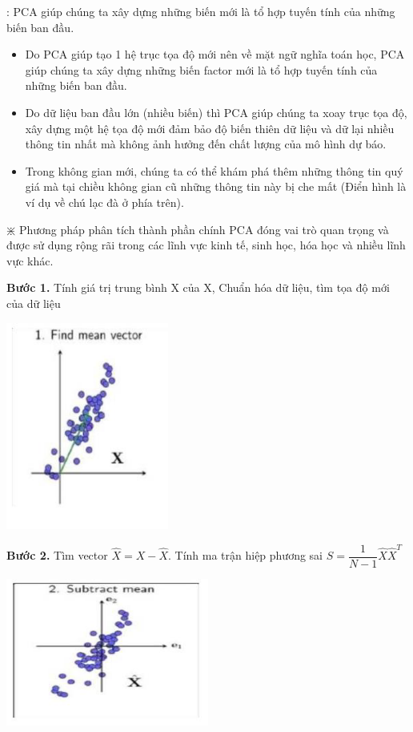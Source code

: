 \documentclass[12pt,a4paper]{article}
\begin{document}
: PCA giúp chúng ta xây dựng những biến mới là tổ hợp tuyến tính của những biến ban đầu.
\begin{itemize}
    \item Do PCA giúp tạo 1 hệ trục tọa độ mới nên về mặt ngữ nghĩa toán học, PCA giúp chúng ta xây dựng những biến factor mới là tổ hợp tuyến tính của những biến ban đầu.
    \item Do dữ liệu ban đầu lớn (nhiều biến) thì PCA giúp chúng ta xoay trục tọa độ, xây dựng một hệ tọa độ mới đảm bảo độ biến thiên dữ liệu và dữ lại nhiều thông tin nhất mà không ảnh hưởng đến chất lượng của mô hình dự báo.
    \item Trong không gian mới, chúng ta có thể khám phá thêm những thông tin quý giá mà tại chiều không gian cũ những thông tin này bị che mất (Điển hình là ví dụ về chú lạc đà ở phía trên).
\end{itemize}
$\divideontimes$ Phương pháp phân tích thành phần chính PCA đóng vai trò quan trọng và được sử dụng rộng rãi trong các lĩnh vực kinh tế, sinh học, hóa học và nhiều lĩnh vực khác.


\textbf{Bước 1.} Tính giá trị trung bình X của X, Chuẩn hóa dữ liệu, tìm tọa độ mới của dữ liệu
\begin{center}
    \includegraphics[width = 0.4\textwidth]{3.png}
\end{center}

\textbf{Bước 2.} Tìm vector $\widehat{X} = X - \widehat{X}$. Tính ma trận hiệp phương sai $S = \dfrac{1}{N-1}\widehat{X} \widehat{X}^T$
\begin{center}
    \includegraphics[width = 0.5\textwidth]{4.png}
\end{center}
\end{document}
